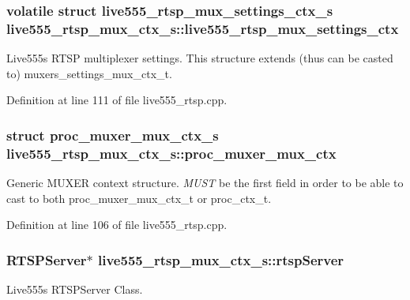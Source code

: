 \subsubsection[{\texorpdfstring{live555\+\_\+rtsp\+\_\+mux\+\_\+settings\+\_\+ctx}{live555_rtsp_mux_settings_ctx}}]{\setlength{\rightskip}{0pt plus 5cm}volatile struct {\bf live555\+\_\+rtsp\+\_\+mux\+\_\+settings\+\_\+ctx\+\_\+s} live555\+\_\+rtsp\+\_\+mux\+\_\+ctx\+\_\+s\+::live555\+\_\+rtsp\+\_\+mux\+\_\+settings\+\_\+ctx}\hypertarget{structlive555__rtsp__mux__ctx__s_a71c6838180308bfa9bf5e3c3caca682f}{}\label{structlive555__rtsp__mux__ctx__s_a71c6838180308bfa9bf5e3c3caca682f}
Live555\textquotesingle{}s R\+T\+SP multiplexer settings. This structure extends (thus can be casted to) muxers\+\_\+settings\+\_\+mux\+\_\+ctx\+\_\+t. 

Definition at line 111 of file live555\+\_\+rtsp.\+cpp.

\subsubsection[{\texorpdfstring{proc\+\_\+muxer\+\_\+mux\+\_\+ctx}{proc_muxer_mux_ctx}}]{\setlength{\rightskip}{0pt plus 5cm}struct {\bf proc\+\_\+muxer\+\_\+mux\+\_\+ctx\+\_\+s} live555\+\_\+rtsp\+\_\+mux\+\_\+ctx\+\_\+s\+::proc\+\_\+muxer\+\_\+mux\+\_\+ctx}\hypertarget{structlive555__rtsp__mux__ctx__s_ab2d3e4e814802a6f61b65465bb222a7c}{}\label{structlive555__rtsp__mux__ctx__s_ab2d3e4e814802a6f61b65465bb222a7c}
Generic M\+U\+X\+ER context structure. {\itshape M\+U\+ST} be the first field in order to be able to cast to both proc\+\_\+muxer\+\_\+mux\+\_\+ctx\+\_\+t or proc\+\_\+ctx\+\_\+t. 

Definition at line 106 of file live555\+\_\+rtsp.\+cpp.

\subsubsection[{\texorpdfstring{rtsp\+Server}{rtspServer}}]{\setlength{\rightskip}{0pt plus 5cm}R\+T\+S\+P\+Server$\ast$ live555\+\_\+rtsp\+\_\+mux\+\_\+ctx\+\_\+s\+::rtsp\+Server}\hypertarget{structlive555__rtsp__mux__ctx__s_a3c89cf1bf900f3846aee1e8a4508043d}{}\label{structlive555__rtsp__mux__ctx__s_a3c89cf1bf900f3846aee1e8a4508043d}
Live555\textquotesingle{}s R\+T\+S\+P\+Server Class. 

